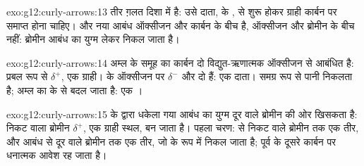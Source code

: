 \begin{solution}{exo:g12:curly-arrows:13}
तीर ग़लत दिशा में है: उसे दाता,  के , से शुरू होकर
ग्राही कार्बन पर समाप्त होना चाहिए। और नया आबंध
ऑक्सीजन और कार्बन के बीच है, ऑक्सीजन और ब्रोमीन के बीच नहीं: ब्रोमीन
 आबंध का युग्म लेकर निकल जाता है।
\end{solution}

\begin{solution}{exo:g12:curly-arrows:14}
अम्ल के  समूह का कार्बन दो
विद्युत-ऋणात्मक ऑक्सीजन  से आबंधित है: प्रबल रूप से $\delta^+$, एक ग्राही।
 के ऑक्सीजन पर $\delta^-$ और दो  हैं: एक दाता।
समग्र रूप से पानी निकलता है; अम्ल का   के
 से बदल जाता है: एक ।
\end{solution}

\begin{solution}{exo:g12:curly-arrows:15}
 के  द्वारा धकेला गया
 आबंध का युग्म दूर वाले ब्रोमीन की ओर खिसकता है: निकट वाला ब्रोमीन
$\delta^+$, एक ग्राही स्थल, बन जाता है। पहला चरण:  से
निकट वाले ब्रोमीन तक एक तीर, और  आबंध से दूर वाले
ब्रोमीन तक एक तीर, जो  के रूप में निकल जाता है; पूर्व  के
दूसरे कार्बन पर धनात्मक आवेश रह जाता है।
\end{solution}

